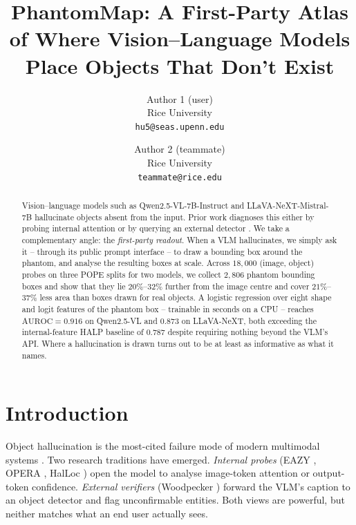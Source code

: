 \documentclass[10pt,twocolumn,letterpaper]{article}
\begin{document}
\title{PhantomMap: A First-Party Atlas of Where Vision--Language Models Place Objects That Don't Exist}

\author{%
  Author 1 (user) \\
  Rice University\\
  {\tt\small hu5@seas.upenn.edu}
  \and
  Author 2 (teammate) \\
  Rice University\\
  {\tt\small teammate@rice.edu}
}

\maketitle

\begin{abstract}
   Vision--language models such as Qwen2.5-VL-7B-Instruct
   \cite{qwen25vl} and LLaVA-NeXT-Mistral-7B \cite{llavanext}
   hallucinate objects absent from the input. Prior work diagnoses
   this either by probing internal attention \cite{eazy,opera,halloc}
   or by querying an external detector \cite{woodpecker}. We take a
   complementary angle: the \emph{first-party readout}. When a VLM
   hallucinates, we simply ask it -- through its public prompt
   interface -- to draw a bounding box around the phantom, and analyse
   the resulting boxes at scale. Across $18{,}000$ (image, object)
   probes on three POPE \cite{pope} splits for two models, we collect
   $2{,}806$ phantom bounding boxes and show that they lie
   $20\%$--$32\%$ further from the image centre and cover
   $21\%$--$37\%$ less area than boxes drawn for real objects.
   A logistic regression over eight shape and logit features of the
   phantom box -- trainable in seconds on a CPU -- reaches
   $\mathrm{AUROC}=0.916$ on Qwen2.5-VL and $0.873$ on LLaVA-NeXT,
   both exceeding the internal-feature HALP baseline of $0.787$
   \cite{halp} despite requiring nothing beyond the VLM's API. Where a
   hallucination is drawn turns out to be at least as informative as
   what it names.
\end{abstract}

\section{Introduction}

Object hallucination is the most-cited failure mode of modern
multimodal systems \cite{hallsurvey,pope}. Two research traditions
have emerged. \emph{Internal probes} (EAZY \cite{eazy}, OPERA
\cite{opera}, HalLoc \cite{halloc}) open the model to analyse
image-token attention or output-token confidence. \emph{External
verifiers} (Woodpecker \cite{woodpecker}) forward the VLM's caption to
an object detector and flag unconfirmable entities. Both views are
powerful, but neither matches what an end user actually sees.
\end{document}
